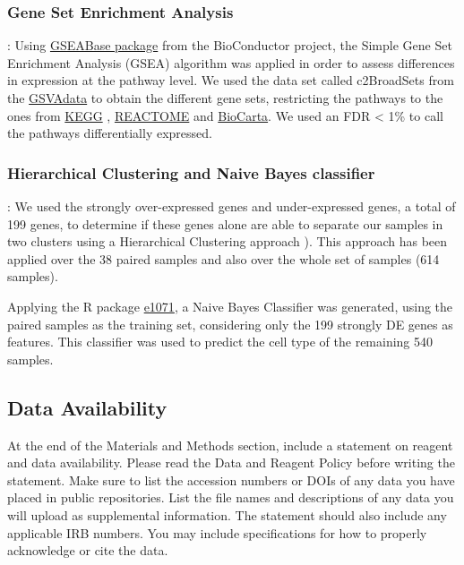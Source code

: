 \documentclass[9pt,twocolumn,twoside]{gsajnl}
\begin{document}
\subsubsection*{Gene Set Enrichment Analysis}
:  Using \href{http://bioconductor.org/packages/release/bioc/html/GSEABase.html}{GSEABase package} from the BioConductor project, the Simple Gene Set Enrichment Analysis (GSEA) algorithm \citep{Subramanian2005, Irizarry2009} was applied in order to assess differences in  expression at the pathway level. We used the data set called c2BroadSets from the \href{https://bioconductor.org/packages/release/data/experiment/html/GSVAdata.html}{GSVAdata} to obtain the different gene sets, restricting the pathways to the ones from \href{http://www.genome.jp/kegg/}{KEGG} , \href{http://www.reactome.org}{REACTOME} and \href{http://www.genecarta.com}{BioCarta}. We used an FDR < 1\% to call the pathways differentially expressed.

\subsubsection*{Hierarchical Clustering and Naive Bayes classifier}
: We used the strongly over-expressed genes and under-expressed genes, a total of 199 genes, to determine if these genes alone are able to separate our samples in two clusters using a Hierarchical Clustering approach \citep{Spearman1904}). This approach has been applied over the 38 paired samples and also over the whole set of samples (614 samples).

Applying the R package \href{https://cran.r-project.org/web/packages/e1071/index.html}{e1071}, a Naive Bayes Classifier \citep{Smyth2004} was generated, using the paired samples as the training set, considering only the 199 strongly DE genes as features. This classifier was used to predict the cell type of the remaining 540 samples. 

\subsection*{Data Availability}

At the end of the Materials and Methods section, include a statement on reagent and data availability. Please read the Data and Reagent Policy before writing the statement. Make sure to list the accession numbers or DOIs of any data you have placed in public repositories. List the file names and descriptions of any data you will upload as supplemental information. The statement should also include any applicable IRB numbers. You may include specifications for how to properly acknowledge or cite the data.
\end{document}

